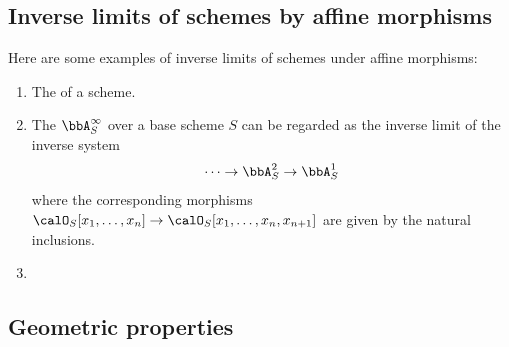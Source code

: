 








\subsection{Inverse limits of schemes by affine morphisms}


\begin{example}
    Here are some examples of inverse limits of schemes under affine morphisms:
    \begin{enumerate}
        \item The  of a scheme.
        \item The  $\bbA_S^\infty$ over a base scheme $S$ can be regarded as the inverse limit of the inverse system
        $$\cdots \to \bbA_S^2 \to \bbA_S^1$$
        where the corresponding morphisms $\calO_S[x_1,\ldots,x_n] \to \calO_S[x_1,\ldots,x_n,x_{n+1}]$ are given by the natural inclusions.

        \item {}
    \end{enumerate}

\end{example}



\subsection{Geometric properties}

